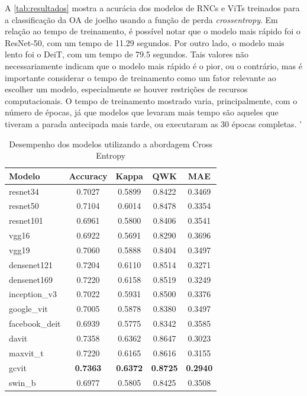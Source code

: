 A \autoref{tab:resultados} mostra a acurácia dos modelos de RNCs e ViTs treinados para a classificação da OA de joelho usando a função de perda \textit{crossentropy}. Em relação ao tempo de treinamento, é possível notar que o modelo mais rápido foi o ResNet-50, com um tempo de 11.29 segundos. Por outro lado, o modelo mais lento foi o DeiT, com um tempo de 79.5 segundos. Tais valores não necessariamente indicam que o modelo mais rápido é o pior, ou o contrário, mas é importante considerar o tempo de treinamento como um fator relevante ao escolher um modelo, especialmente se houver restrições de recursos computacionais. O tempo de treinamento mostrado varia, principalmente, com o número de épocas, já que modelos que levaram mais tempo são aqueles que tiveram a parada antecipada mais tarde, ou executaram as 30 épocas completas.
'
\begin{table}
    \centering
    \caption{Desempenho dos modelos utilizando a abordagem Cross Entropy}
    \begin{tabular}{lcccc}
        \toprule
        \textbf{Modelo} & \textbf{Accuracy} & \textbf{Kappa} & \textbf{QWK} & \textbf{MAE} \\
        \midrule
        resnet34       & 0.7027 & 0.5899 & 0.8422 & 0.3469 \\
        resnet50       & 0.7104 & 0.6014 & 0.8478 & 0.3354 \\
        resnet101      & 0.6961 & 0.5800 & 0.8406 & 0.3541 \\
        vgg16          & 0.6922 & 0.5691 & 0.8290 & 0.3696 \\
        vgg19          & 0.7060 & 0.5888 & 0.8404 & 0.3497 \\
        densenet121    & 0.7204 & 0.6110 & 0.8514 & 0.3271 \\
        densenet169    & 0.7220 & 0.6158 & 0.8519 & 0.3249 \\
        inception\_v3  & 0.7022 & 0.5931 & 0.8500 & 0.3376 \\
        google\_vit    & 0.7005 & 0.5878 & 0.8380 & 0.3497 \\
        facebook\_deit & 0.6939 & 0.5775 & 0.8342 & 0.3585 \\
        davit          & 0.7358 & 0.6362 & 0.8647 & 0.3023 \\
        maxvit\_t      & 0.7220 & 0.6165 & 0.8616 & 0.3155 \\
        gcvit          & \textbf{0.7363} & \textbf{0.6372} & \textbf{0.8725} & \textbf{0.2940} \\
        swin\_b        & 0.6977 & 0.5805 & 0.8425 & 0.3508 \\
        \bottomrule
    \end{tabular}
    \label{tab:resultados-5-crossentropy}
\end{table}

